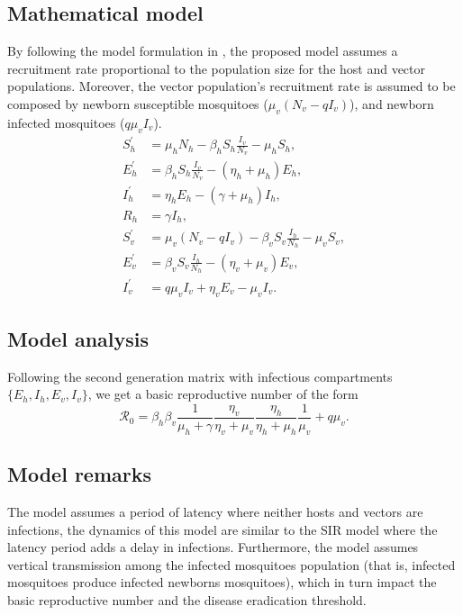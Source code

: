 \documentclass{book}
\begin{document}
\subsection*{Mathematical model}
By following the model formulation in \cite{brauer2019mathematical}, the proposed model assumes a recruitment rate proportional to the population size for the host and vector populations. Moreover, the vector population's recruitment rate is assumed to be composed by newborn susceptible mosquitoes ($\mu_v(N_v-qI_v)$), and newborn infected mosquitoes ($q\mu_v I_v$).
%
\begin{align}
\label{eq:denguemodel}
\nonumber S_{h}^{\prime} &=\mu_{h} N_{h}-\beta_{h} S_{h}\frac{I_{v}}{N_{v}}-\mu_{h} S_{h}, \\
\nonumber E_{h}^{\prime} &=\beta_{h} S_{h} \frac{I_{v}}{N_{v}}-\left(\eta_{h}+\mu_{h}\right) E_{h}, \\
\nonumber I_{h}^{\prime} &=\eta_{h} E_{h}-\left(\gamma+\mu_{h}\right) I_{h},\\
R_h &= \gamma I_h,\\
\nonumber S_{v}^{\prime} &=\mu_{v}\left(N_{v}-qI_{v}\right)-\beta_{v} S_{v} \frac{I_{h}}{N_{h}}-\mu_{v} S_{v}, \\
\nonumber E_{v}^{\prime} &=\beta_{v} S_{v} \frac{I_{h}}{N_{h}}-\left(\eta_{v}+\mu_{v}\right) E_{v}, \\
\nonumber I_{v}^{\prime} &=q \mu_{v} I_{v}+\eta_{v} E_{v}-\mu_{v} I_{v}.
\end{align}

\subsection*{Model analysis}
Following the second generation matrix with infectious compartments $\{E_h,I_h,E_v,I_v\}$, we get a basic reproductive number of the form
\begin{equation}
    \mathcal{R}_0=\beta_{h} \beta_{v} \frac{1}{\mu_{h}+\gamma} \frac{\eta_{v}}{\eta_{v}+\mu_{v}} \frac{\eta_{h}}{\eta_{h}+\mu_{h}} \frac{1}{\mu_{v}}+q\mu_v.
\end{equation}

\subsection*{Model remarks}
The model assumes a period of latency where neither hosts and vectors are infections, the dynamics of this model are similar to the SIR model where the latency period adds a delay in infections. Furthermore, the model assumes vertical transmission among the infected mosquitoes population (that is, infected mosquitoes produce infected newborns mosquitoes), which in turn impact the basic reproductive number and the disease eradication threshold.
\end{document}
